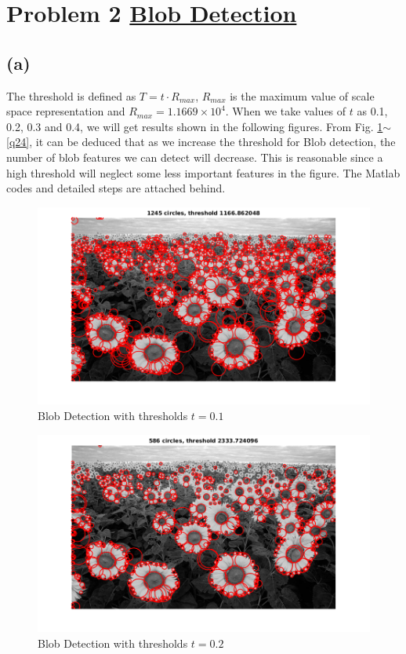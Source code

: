 \documentclass[letterpaper]{article}
\begin{document}
\clearpage

\section*{Problem 2 \underline{Blob Detection}}
\subsection*{(a)}
The threshold is defined as $T = t\cdot R_{max}$, $R_{max}$ is the maximum value of scale space representation and $R_{max} = 1.1669\times 10^4$. When we take values of $t$ as 0.1, 0.2, 0.3 and 0.4, we will get results shown in the following figures. From Fig. \ref{q21}$\sim$\ref{q24}, it can be deduced that as we increase the threshold for Blob detection, the number of blob features we can detect will decrease. This is reasonable since a high threshold will neglect some less important features in the figure. The Matlab codes and detailed steps are attached behind.
\begin{figure}[H]
\centering
\includegraphics[scale=0.6]{q2t01.png}
\caption{Blob Detection with thresholds $t = 0.1$}
\label{q21}
\end{figure}
\begin{figure}[H]
\centering
\includegraphics[scale=0.6]{q2t02.png}
\caption{Blob Detection with thresholds $t = 0.2$}
\label{q22}
\end{figure}
\end{document}
